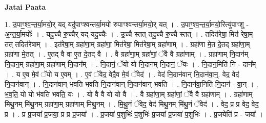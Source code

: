 \documentclass[17pt]{extarticle}
\begin{document}
\textbf{Jatai Paata} \newline

1. उ॒पाꣳ॒॒श्व॒न्त॒र्या॒मयो॒र् यद् यदु॑पाꣳश्वन्तर्या॒मयो॑ रुपाꣳश्वन्तर्या॒मयो॒र् यत् । . उ॒पाꣳ॒॒श्व॒न्त॒र्या॒मयो॒रित्यु॑पाꣳशु - अ॒न्त॒र्या॒मयोः᳚ । . यदु॒च्चै रु॒च्चैर् यद् यदु॒च्चैः । . उ॒च्चै स्तत् तदु॒च्चै रु॒च्चै स्तत् । . तदित॑रेषा॒ मित॑ रेषा॒म् तत् तदित॑रेषाम् । . इत॑रेषा॒म् ग्रहा॑णा॒म् ग्रहा॑णा॒ मित॑रेषा॒ मित॑रेषा॒म् ग्रहा॑णाम् । . ग्रहा॑णा मे॒त दे॒तद् ग्रहा॑णा॒म् ग्रहा॑णा मे॒तत् । . ए॒तद् वै वा ए॒त दे॒तद् वै । . वै ग्रहा॑णा॒म् ग्रहा॑णां॒ ॅवै वै ग्रहा॑णाम् । . ग्रहा॑णाम् नि॒दान॑म् नि॒दान॒म् ग्रहा॑णा॒म् ग्रहा॑णाम् नि॒दान᳚म् । . नि॒दानं॒ ॅयो यो नि॒दान॑म् नि॒दानं॒ ॅयः । . नि॒दान॒मिति॑ नि - दान᳚म् । . य ए॒व मे॒वं ॅयो य ए॒वम् । . ए॒वं ॅवेद॒ वेदै॒व मे॒वं ॅवेद॑ । . वेद॑ नि॒दान॑वान् नि॒दान॑वा॒न्॒. वेद॒ वेद॑ नि॒दान॑वान् । . नि॒दान॑वान् भवति भवति नि॒दान॑वान् नि॒दान॑वान् भवति । . नि॒दान॑वा॒निति॑ नि॒दान॑ - वा॒न् । . भ॒व॒ति॒ यो यो भ॑वति भवति॒ यः । . यो वै वै यो यो वै । . वै ग्रहा॑णा॒म् ग्रहा॑णां॒ ॅवै वै ग्रहा॑णाम् । . ग्रहा॑णाम् मिथु॒नम् मि॑थु॒नम् ग्रहा॑णा॒म् ग्रहा॑णाम् मिथु॒नम् । . मि॒थु॒नं ॅवेद॒ वेद॑ मिथु॒नम् मि॑थु॒नं ॅवेद॑ । . वेद॒ प्र प्र वेद॒ वेद॒ प्र । . प्र प्र॒जया᳚ प्र॒जया॒ प्र प्र प्र॒जया᳚ । . प्र॒जया॑ प॒शुभिः॑ प॒शुभिः॑ प्र॒जया᳚ प्र॒जया॑ प॒शुभिः॑ । . प्र॒जयेति॑ प्र - जया᳚ । \newline
\end{document}
